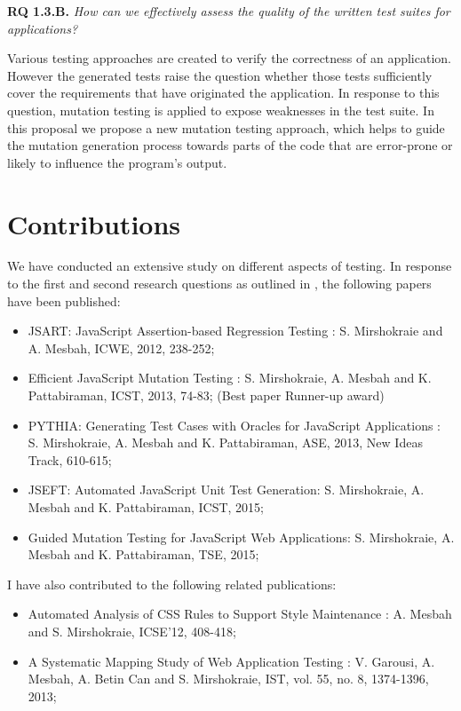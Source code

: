 {\bf RQ 1.3.B.} \emph{How can we effectively assess the quality of the written test suites for \javascript applications?}

Various testing approaches are created to verify the correctness of an application. However the generated tests raise the question whether those tests sufficiently cover the requirements that have originated the application.  In response to this question, mutation testing is applied to expose weaknesses in the test suite.
In this proposal we propose a new \javascript mutation testing approach, which helps to guide the
mutation generation process towards parts of the code that are error-prone or likely to influence the program's
output.

\section{Contributions} \label{Sec:contrib}
We have conducted an
extensive study on different aspects of \javascript testing. In response to the first and second research questions as outlined in , the following papers have been published:
\begin{itemize} [noitemsep, nolistsep]
\item JSART: JavaScript Assertion-based Regression Testing \cite{mirshokraie:icwe12}:
S. Mirshokraie and A. Mesbah, ICWE, 2012, 238-252;
\item Efficient JavaScript Mutation Testing \cite{mirshokraie:icst13}:
S. Mirshokraie, A. Mesbah and K. Pattabiraman, ICST, 2013, 74-83; (Best paper Runner-up award)
\item PYTHIA: Generating Test Cases with Oracles
for JavaScript Applications \cite{shabnam:ase13}: 
S. Mirshokraie, A. Mesbah and K. Pattabiraman, ASE, 2013, New Ideas Track, 610-615;
\item JSEFT: Automated JavaScript Unit Test Generation:
S. Mirshokraie, A. Mesbah and K. Pattabiraman, ICST, 2015;
\item Guided Mutation Testing for JavaScript Web Applications:
S. Mirshokraie, A. Mesbah and K. Pattabiraman, TSE, 2015;
\end{itemize}

I have also contributed to the following related publications:
\begin{itemize} [noitemsep, nolistsep]
\item Automated Analysis of CSS Rules to Support Style Maintenance \cite{mesbah:icse12}: 
A. Mesbah and S. Mirshokraie, ICSE'12, 408-418;
\item A Systematic Mapping Study of Web Application Testing \cite{garousi:ist13}: 
V. Garousi, A. Mesbah, A. Betin Can and S. Mirshokraie, IST, vol. 55, no. 8, 1374-1396, 2013;
\end{itemize}
